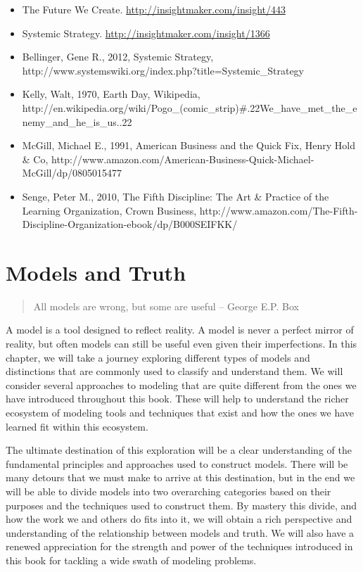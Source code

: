 \documentclass[]{memoir}
\begin{document}
\begin{itemize}
\itemsep1pt\parskip0pt
\item
  The Future We Create. \url{http://insightmaker.com/insight/443}
\item
  Systemic Strategy. \url{http://insightmaker.com/insight/1366}
\item
  Bellinger, Gene R., 2012, Systemic Strategy,
  http://www.systemswiki.org/index.php?title=Systemic\_Strategy
\item
  Kelly, Walt, 1970, Earth Day, Wikipedia,
  http://en.wikipedia.org/wiki/Pogo\_(comic\_strip)\#.22We\_have\_met\_the\_enemy\_and\_he\_is\_us..22
\item
  McGill, Michael E., 1991, American Business and the Quick Fix, Henry
  Hold \& Co,
  http://www.amazon.com/American-Business-Quick-Michael-McGill/dp/0805015477
\item
  Senge, Peter M., 2010, The Fifth Discipline: The Art \& Practice of
  the Learning Organization, Crown Business,
  http://www.amazon.com/The-Fifth-Discipline-Organization-ebook/dp/B000SEIFKK/
\end{itemize}

\chapter{Models and Truth}

\begin{quote}
All models are wrong, but some are useful -- George E.P. Box
\end{quote}

A model is a tool designed to reflect reality. A model is never a
perfect mirror of reality, but often models can still be useful even
given their imperfections. In this chapter, we will take a journey
exploring different types of models and distinctions that are commonly
used to classify and understand them. We will consider several
approaches to modeling that are quite different from the ones we have
introduced throughout this book. These will help to understand the
richer ecosystem of modeling tools and techniques that exist and how the
ones we have learned fit within this ecosystem.

The ultimate destination of this exploration will be a clear
understanding of the fundamental principles and approaches used to
construct models. There will be many detours that we must make to arrive
at this destination, but in the end we will be able to divide models
into two overarching categories based on their purposes and the
techniques used to construct them. By mastery this divide, and how the
work we and others do fits into it, we will obtain a rich perspective
and understanding of the relationship between models and truth. We will
also have a renewed appreciation for the strength and power of the
techniques introduced in this book for tackling a wide swath of modeling
problems.
\end{document}
